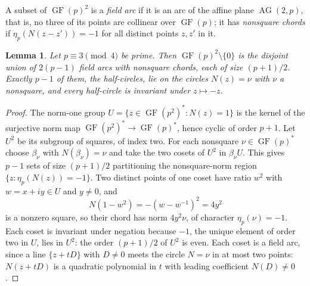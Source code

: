 \documentclass[11pt]{article}
\newtheorem{lemma}[theorem]{Lemma}
\theoremstyle{definition}
\theoremstyle{remark}
\newcommand{\GF}{\operatorname{GF}}
\newcommand{\AG}{\operatorname{AG}}
\newcommand{\qc}{\eta_p}
\begin{document}
A subset of \(\GF(p)^2\) is a \emph{field arc} if it is an arc of the
affine plane \(\AG(2,p)\), that is, no three of its points are collinear
over \(\GF(p)\); it has \emph{nonsquare chords} if \(\qc(N(z-z'))=-1\)
for all distinct points \(z,z'\) in it.

\begin{lemma}\label{lem:field-partition}
Let \(p\equiv3\pmod4\) be prime.  Then \(\GF(p)^2\setminus\{0\}\) is the
disjoint union of \(2(p-1)\) field arcs with nonsquare chords, each of
size \((p+1)/2\).  Exactly \(p-1\) of them, the \emph{half-circles}, lie
on the circles \(N(z)=\nu\) with \(\nu\) a nonsquare, and every
half-circle is invariant under \(z\mapsto-z\).
\end{lemma}

\begin{proof}
The norm-one group \(U=\{z\in\GF(p^2)^*:N(z)=1\}\) is the kernel of the
surjective norm map \(\GF(p^2)^*\to\GF(p)^*\), hence cyclic of order
\(p+1\).  Let \(U^2\) be its subgroup of squares, of index two.  For each
nonsquare \(\nu\in\GF(p)^*\) choose \(\beta_\nu\) with
\(N(\beta_\nu)=\nu\) and take the two cosets of \(U^2\) in
\(\beta_\nu U\).  This gives \(p-1\) sets of size \((p+1)/2\)
partitioning the nonsquare-norm region \(\{z:\qc(N(z))=-1\}\).  Two
distinct points of one coset have ratio \(w^2\) with \(w=x+iy\in U\) and
\(y\ne0\), and
\[
  N(1-w^2)=-(w-w^{-1})^2=4y^2
\]
is a nonzero square, so their chord has norm \(4y^2\nu\), of character
\(\qc(\nu)=-1\).  Each coset is invariant under negation because \(-1\),
the unique element of order two in \(U\), lies in \(U^2\): the order
\((p+1)/2\) of \(U^2\) is even.  Each coset is a field arc, since a line
\(\{z+tD\}\) with \(D\ne0\) meets the circle \(N=\nu\) in at most two
points: \(N(z+tD)\) is a quadratic polynomial in \(t\) with leading
coefficient \(N(D)\ne0\).


\end{proof}
\end{document}
